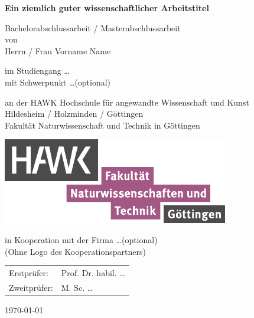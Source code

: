 

\begin{titlepage}
	\begin{center}
		{\Large \textbf{Ein ziemlich guter wissenschaftlicher Arbeitstitel}}
		
		\vspace{\fill}
		
		Bachelorabschlussarbeit / Masterabschlussarbeit \\
		von \\
		Herrn / Frau Vorname Name
		
		\vspace{0.9cm}
		
		im Studiengang \dots \\
		mit Schwerpunkt \dots (optional)\\
		
		\vspace{0.9cm}
		
		an der HAWK Hochschule für angewandte Wissenschaft und Kunst\\
		Hildesheim / Holzminden / Göttingen\\
		Fakultät Naturwissenschaft und Technik in Göttingen
		
		\vspace{0.1cm}
		
		\includegraphics[height=3.cm]{pic/hawk-fn-logo}
		
		\vspace{0.1cm}
		
		in Kooperation mit der Firma \dots (optional)\\
		(Ohne Logo des Kooperationspartners)
		
		\vspace{2.0cm}
		
		\begin{tabular}{p{3cm}l}
			Erstprüfer: & Prof. Dr. habil. \dots \\ 
			Zweitprüfer: & M. Sc. \dots \\  
		\end{tabular} 
		
		\vspace{1.6cm}
	
		\today
		
	\end{center}
	
	
	
\end{titlepage}
